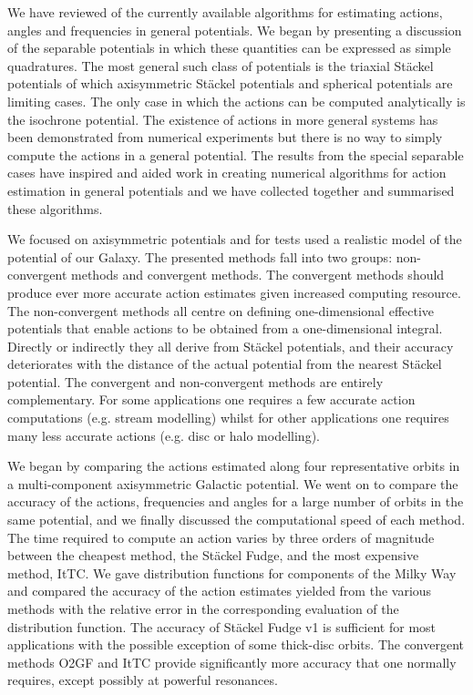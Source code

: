 \documentclass[useAMS,usenatbib,fleqn,a4paper]{mn2e}
\begin{document}
We have reviewed of the currently available algorithms for
estimating actions, angles and frequencies in general potentials. We began by presenting a discussion of the separable potentials in which these quantities can be expressed as simple quadratures. The most general such class of potentials is the triaxial St\"ackel potentials of which axisymmetric St\"ackel potentials and spherical potentials are limiting cases. The only case in which the actions can be computed analytically is the isochrone potential. The existence of actions in more general systems has been demonstrated from numerical experiments but there is no way to simply compute the actions in a general potential. The results from the special separable cases have inspired and aided work in creating numerical algorithms for action estimation in general potentials and we have collected together and summarised these algorithms.

We focused
on axisymmetric potentials and for tests used a realistic model of the
potential of our Galaxy. The presented methods fall into two groups: non-convergent
methods and convergent methods.
The convergent methods should produce ever more accurate action estimates
given increased computing resource.
The non-convergent methods all centre on
defining one-dimensional effective potentials that enable actions to be
obtained from a one-dimensional integral. Directly or indirectly they all
derive from St\"ackel potentials, and their accuracy deteriorates with the
distance of the actual potential from the nearest St\"ackel potential.  The
convergent and non-convergent methods are entirely complementary. For some
applications one requires a few accurate action computations (e.g. stream
modelling) whilst for other applications one requires many less accurate
actions (e.g. disc or halo modelling).

We began by comparing the actions estimated along four representative orbits
in a multi-component axisymmetric Galactic potential. We went on to compare
the accuracy of the actions, frequencies and angles for a large number of
orbits in the same potential, and we finally discussed the computational
speed of each method. The time required to compute an action varies by three
orders of magnitude between the cheapest method, the St\"ackel Fudge, and the
most expensive method, ItTC.  We gave distribution functions for components of the Milky Way and compared the accuracy of the action estimates yielded from the various methods with the relative error in the corresponding evaluation of the distribution function. The accuracy of
St\"ackel Fudge v1 is sufficient for most applications with the possible
exception of some thick-disc orbits. The convergent methods O2GF and
ItTC provide significantly more accuracy that one normally requires,
except possibly at powerful resonances.
\end{document}
